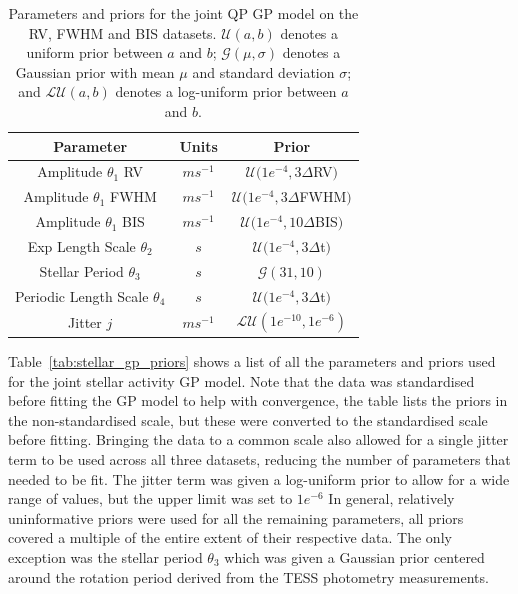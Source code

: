 \begin{table}[htb]
    \centering
    \begin{tabular}{ccc}
        \toprule
        \toprule
        Parameter & Units & Prior \\
        \midrule
        Amplitude $\theta_{1}$ RV & $ms^{-1}$ & $\mathcal{U}(1e^{-4}, 3 \Delta$RV$)$ \\
        \addlinespace
        Amplitude $\theta_{1}$ FWHM & $ms^{-1}$ & $\mathcal{U}(1e^{-4}, 3 \Delta$FWHM$)$  \\
        \addlinespace
        Amplitude $\theta_{1}$ BIS & $ms^{-1}$ & $\mathcal{U}(1e^{-4}, 10 \Delta$BIS$)$ \\
        \addlinespace
        Exp Length Scale $\theta_{2}$ & $s$ & $\mathcal{U}(1e^{-4}, 3 \Delta$t$)$ \\
        \addlinespace
        Stellar Period $\theta_{3}$ & $s$ & $\mathcal{G}(31, 10)$ \\
        \addlinespace
        Periodic Length Scale $\theta_{4}$ & $s$ & $\mathcal{U}(1e^{-4}, 3 \Delta$t$)$ \\
        \addlinespace
        Jitter $j$ & $ms^{-1}$ & $\mathcal{LU}(1e^{-10}, 1e^{-6})$ \\
        \bottomrule
    \end{tabular}
    \caption{Parameters and priors for the joint QP GP model on the RV, FWHM and BIS datasets.
    $\mathcal{U}(a, b)$ denotes a uniform prior between $a$ and $b$; $\mathcal{G}(\mu, \sigma)$ denotes a Gaussian prior
    with mean $\mu$ and standard deviation $\sigma$; and $\mathcal{LU}(a, b)$ denotes a log-uniform prior between $a$ and $b$.}
    \label{tab:stellar_gp_priors}
\end{table}

Table~\eqref{tab:stellar_gp_priors} shows a list of all the parameters and priors used for the joint stellar activity
GP model.
Note that the data was standardised before fitting the GP model to help with convergence, the table lists the priors
in the non-standardised scale, but these were converted to the standardised scale before fitting.
Bringing the data to a common scale also allowed for a single jitter term to be used across all three datasets, reducing
the number of parameters that needed to be fit.
The jitter term was given a log-uniform prior to allow for a wide range of values, but the upper limit was set to $1e^{-6}$
In general, relatively uninformative priors were used for all the remaining parameters, all priors covered a multiple of the entire
extent of their respective data.
The only exception was the stellar period $\theta_{3}$ which was given a Gaussian prior centered around the rotation
period derived from the TESS photometry measurements.

